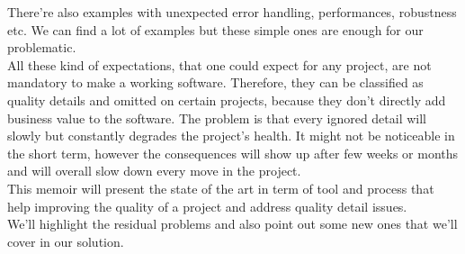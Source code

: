 There're also examples with unexpected error handling, performances,
robustness etc.
We can find a lot of examples but these simple ones are enough for our
problematic. \\
\newline
All these kind of expectations, that one could expect for any project, are
not mandatory to make a working software.
Therefore, they can be classified as quality details and omitted on certain
projects, because they don't directly add business value to the software.
The problem is that every ignored detail will slowly but constantly degrades
the project's health.
It might not be noticeable in the short term, however the consequences will
show up after few weeks or months and will overall slow down every move in
the project. \\
\newline
This memoir will present the state of the art in term of tool
and process that help improving the quality of a project and address quality
detail issues. \\
We'll highlight the residual problems and also point out some new ones that
we'll cover in our solution.
